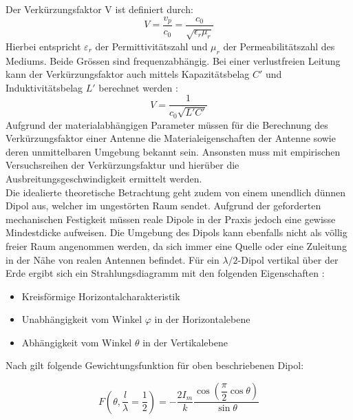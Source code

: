 Der Verkürzungsfaktor V ist definiert durch:
\begin{equation}
V=\dfrac{v_p}{c_0}=\dfrac{c_0}{\sqrt{\epsilon_r \mu_r}}
\end{equation}
Hierbei entspricht $\varepsilon_r$ der Permittivitätszahl und $\mu_r$ der Permeabilitätszahl des Mediums. Beide Grössen sind frequenzabhängig. Bei einer verlustfreien Leitung kann der Verkürzungsfaktor auch mittels Kapazitätsbelag $C'$ und Induktivitätsbelag $L'$ berechnet werden \cite{Verkuertzungsfaktor_wiki}:
\begin{equation}\label{V_verlustfreie_Leitung}
V=\dfrac{1}{c_0 \sqrt{L'C'}} 
\end{equation}
Aufgrund der materialabhängigen Parameter müssen für die Berechnung des Verkürzungsfaktor einer Antenne die Materialeigenschaften der Antenne sowie deren unmittelbaren Umgebung bekannt sein. Ansonsten muss mit empirischen Versuchsreihen der Verkürzungsfaktur und hierüber die Ausbreitungsgeschwindigkeit ermittelt werden.\\

Die idealierte theoretische Betrachtung geht zudem von einem unendlich dünnen Dipol aus, welcher im ungestörten Raum sendet. Aufgrund der geforderten mechanischen Festigkeit müssen reale Dipole in der Praxis jedoch eine gewisse Mindestdicke aufweisen. Die Umgebung des Dipols kann ebenfalls nicht als völlig freier Raum angenommen werden, da sich immer eine Quelle oder eine Zuleitung in der Nähe von realen Antennen befindet. Für ein $\lambda /2$-Dipol vertikal über der Erde ergibt sich ein Strahlungsdiagramm mit den folgenden Eigenschaften  \cite{zinke1965lehrbuch}: 
\begin{itemize}
\item Kreisförmige Horizontalcharakteristik
\item Unabhängigkeit vom Winkel $\varphi$ in der Horizontalebene
\item Abhängigkeit vom Winkel $\theta$ in der Vertikalebene
\end{itemize}
Nach \cite{elliott1981antenna} gilt folgende Gewichtungsfunktion für oben beschriebenen Dipol:

\begin{equation}\label{eq:FDipolTheat}
F(\theta,\frac{l}{\lambda}=\dfrac{1}{2})=-\dfrac{2I_{m}}{k}\dfrac{\cos\left(\dfrac{\pi}{2}\cos\theta\right)}{\sin\theta}
\end{equation}

